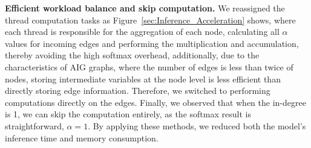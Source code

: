 
\textbf{Efficient workload balance and skip computation.} We reassigned the thread computation tasks as Figure~\ref{sec:Inference_Acceleration} shows, where each thread is responsible for the aggregation of each node, calculating all \(\alpha\) values for incoming edges and performing the multiplication and accumulation, thereby avoiding the high softmax overhead, additionally, due to the characteristics of AIG graphs, where the number of edges is less than twice of nodes, storing intermediate variables at the node level is less efficient than directly storing edge information. Therefore, we switched to performing computations directly on the edges. Finally, we observed that when the in-degree is 1, we can skip the computation entirely, as the softmax result is straightforward, \ie $\alpha=1$. By applying these methods, we reduced both the model's inference time and memory consumption.

